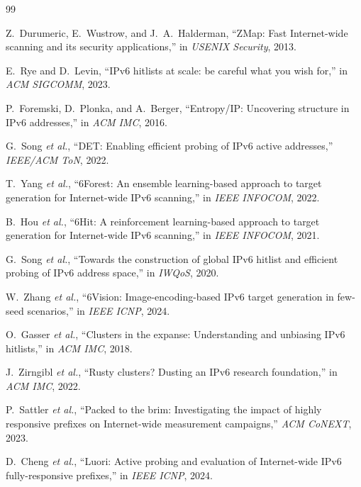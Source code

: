 \documentclass[conference]{IEEEtran}
\begin{document}
\begin{thebibliography}{99}

Z.~Durumeric, E.~Wustrow, and J.~A.~Halderman,
``ZMap: Fast Internet-wide scanning and its security applications,''
in \emph{USENIX Security}, 2013.

E.~Rye and D.~Levin,
``IPv6 hitlists at scale: be careful what you wish for,''
in \emph{ACM SIGCOMM}, 2023.

P.~Foremski, D.~Plonka, and A.~Berger,
``Entropy/IP: Uncovering structure in IPv6 addresses,''
in \emph{ACM IMC}, 2016.

G.~Song \emph{et al.},
``DET: Enabling efficient probing of IPv6 active addresses,''
\emph{IEEE/ACM ToN}, 2022.

T.~Yang \emph{et al.},
``6Forest: An ensemble learning-based approach to target generation for
Internet-wide IPv6 scanning,''
in \emph{IEEE INFOCOM}, 2022.

B.~Hou \emph{et al.},
``6Hit: A reinforcement learning-based approach to target generation
for Internet-wide IPv6 scanning,''
in \emph{IEEE INFOCOM}, 2021.

G.~Song \emph{et al.},
``Towards the construction of global IPv6 hitlist and efficient probing
of IPv6 address space,''
in \emph{IWQoS}, 2020.

W.~Zhang \emph{et al.},
``6Vision: Image-encoding-based IPv6 target generation in few-seed
scenarios,''
in \emph{IEEE ICNP}, 2024.

O.~Gasser \emph{et al.},
``Clusters in the expanse: Understanding and unbiasing IPv6 hitlists,''
in \emph{ACM IMC}, 2018.

J.~Zirngibl \emph{et al.},
``Rusty clusters? Dusting an IPv6 research foundation,''
in \emph{ACM IMC}, 2022.

P.~Sattler \emph{et al.},
``Packed to the brim: Investigating the impact of highly responsive
prefixes on Internet-wide measurement campaigns,''
\emph{ACM CoNEXT}, 2023.

D.~Cheng \emph{et al.},
``Luori: Active probing and evaluation of Internet-wide IPv6
fully-responsive prefixes,''
in \emph{IEEE ICNP}, 2024.


\end{thebibliography}
\end{document}
